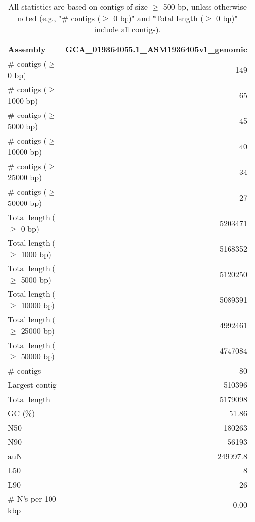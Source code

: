 \documentclass[12pt,a4paper]{article}
\begin{document}
\begin{table}[ht]
\begin{center}
\caption{All statistics are based on contigs of size $\geq$ 500 bp, unless otherwise noted (e.g., "\# contigs ($\geq$ 0 bp)" and "Total length ($\geq$ 0 bp)" include all contigs).}
\begin{tabular}{|l*{1}{|r}|}
\hline
Assembly & GCA\_019364055.1\_ASM1936405v1\_genomic \\ \hline
\# contigs ($\geq$ 0 bp) & 149 \\ \hline
\# contigs ($\geq$ 1000 bp) & 65 \\ \hline
\# contigs ($\geq$ 5000 bp) & 45 \\ \hline
\# contigs ($\geq$ 10000 bp) & 40 \\ \hline
\# contigs ($\geq$ 25000 bp) & 34 \\ \hline
\# contigs ($\geq$ 50000 bp) & 27 \\ \hline
Total length ($\geq$ 0 bp) & 5203471 \\ \hline
Total length ($\geq$ 1000 bp) & 5168352 \\ \hline
Total length ($\geq$ 5000 bp) & 5120250 \\ \hline
Total length ($\geq$ 10000 bp) & 5089391 \\ \hline
Total length ($\geq$ 25000 bp) & 4992461 \\ \hline
Total length ($\geq$ 50000 bp) & 4747084 \\ \hline
\# contigs & 80 \\ \hline
Largest contig & 510396 \\ \hline
Total length & 5179098 \\ \hline
GC (\%) & 51.86 \\ \hline
N50 & 180263 \\ \hline
N90 & 56193 \\ \hline
auN & 249997.8 \\ \hline
L50 & 8 \\ \hline
L90 & 26 \\ \hline
\# N's per 100 kbp & 0.00 \\ \hline
\end{tabular}
\end{center}
\end{table}
\end{document}
